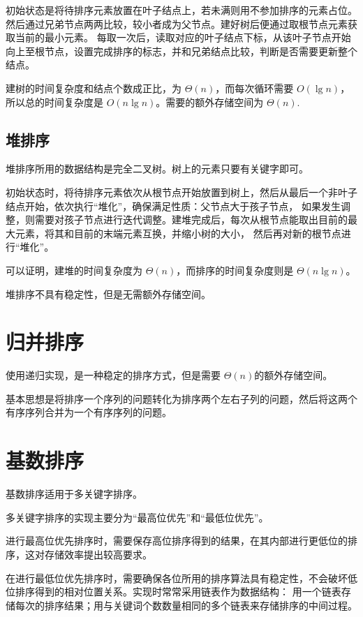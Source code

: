 初始状态是将待排序元素放置在叶子结点上，若未满则用不参加排序的元素占位。
然后通过兄弟节点两两比较，较小者成为父节点。建好树后便通过取根节点元素获取当前的最小元素。
每取一次后，读取对应的叶子结点下标，从该叶子节点开始向上至根节点，设置完成排序的标志，并和兄弟结点比较，判断是否需要更新整个结点。

建树的时间复杂度和结点个数成正比，为 $\Theta(n)$，而每次循环需要 $O(\lg n)$，所以总的时间复杂度是 $O(n\lg n)$。需要的额外存储空间为 $\Theta(n)$.
\subsection{堆排序}
堆排序所用的数据结构是完全二叉树。树上的元素只要有关键字即可。

初始状态时，将待排序元素依次从根节点开始放置到树上，然后从最后一个非叶子结点开始，依次执行“堆化”，确保满足性质：父节点大于孩子节点，
如果发生调整，则需要对孩子节点进行迭代调整。建堆完成后，每次从根节点能取出目前的最大元素，将其和目前的末端元素互换，并缩小树的大小，
然后再对新的根节点进行“堆化”。

可以证明，建堆的时间复杂度为 $\Theta(n)$，而排序的时间复杂度则是 $\Theta(n\lg n)$。

堆排序不具有稳定性，但是无需额外存储空间。
\section{归并排序}
使用递归实现，是一种稳定的排序方式，但是需要 $\Theta(n)$的额外存储空间。

基本思想是将排序一个序列的问题转化为排序两个左右子列的问题，然后将这两个有序序列合并为一个有序序列的问题。
\section{基数排序}
基数排序适用于多关键字排序。

多关键字排序的实现主要分为“最高位优先”和“最低位优先”。

进行最高位优先排序时，需要保存高位排序得到的结果，在其内部进行更低位的排序，这对存储效率提出较高要求。

在进行最低位优先排序时，需要确保各位所用的排序算法具有稳定性，不会破坏低位排序得到的相对位置关系。实现时常常采用链表作为数据结构：
用一个链表存储每次的排序结果；用与关键词个数数量相同的多个链表来存储排序的中间过程。